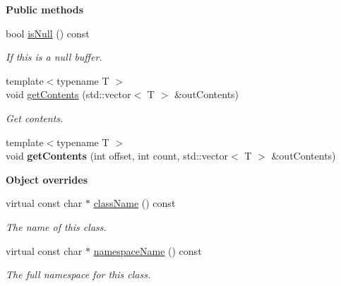 \begin{Indent}\textbf{ Public methods}\par
\begin{DoxyCompactItemize}
\item 
\mbox{\label{classrev_1_1_g_l_1_1_buffer_object_a22ffb3a6972fb0046d864d281b0e9fd6}} 
bool \mbox{\hyperlink{classrev_1_1_g_l_1_1_buffer_object_a22ffb3a6972fb0046d864d281b0e9fd6}{is\+Null}} () const
\begin{DoxyCompactList}\small\item\em If this is a null buffer. \end{DoxyCompactList}\item 
{\footnotesize template$<$typename T $>$ }\\void \mbox{\hyperlink{classrev_1_1_g_l_1_1_buffer_object_a3f896c126a6156121373e6c71cdd7fe5}{get\+Contents}} (std\+::vector$<$ T $>$ \&out\+Contents)
\begin{DoxyCompactList}\small\item\em Get contents. \end{DoxyCompactList}\item 
\mbox{\label{classrev_1_1_g_l_1_1_buffer_object_a6eb62abce9c776b7f2fdd44105c8dd7b}} 
{\footnotesize template$<$typename T $>$ }\\void {\bfseries get\+Contents} (int offset, int count, std\+::vector$<$ T $>$ \&out\+Contents)
\end{DoxyCompactItemize}
\end{Indent}
\begin{Indent}\textbf{ Object overrides}\par
\begin{DoxyCompactItemize}
\item 
\mbox{\label{classrev_1_1_g_l_1_1_buffer_object_a0f1a209cd0a7c2d95e91ac458cd6c2aa}} 
virtual const char $\ast$ \mbox{\hyperlink{classrev_1_1_g_l_1_1_buffer_object_a0f1a209cd0a7c2d95e91ac458cd6c2aa}{class\+Name}} () const
\begin{DoxyCompactList}\small\item\em The name of this class. \end{DoxyCompactList}\item 
\mbox{\label{classrev_1_1_g_l_1_1_buffer_object_a5f40094443e3a7b57c4227d5affa72d1}} 
virtual const char $\ast$ \mbox{\hyperlink{classrev_1_1_g_l_1_1_buffer_object_a5f40094443e3a7b57c4227d5affa72d1}{namespace\+Name}} () const
\begin{DoxyCompactList}\small\item\em The full namespace for this class. \end{DoxyCompactList}\end{DoxyCompactItemize}
\end{Indent}
